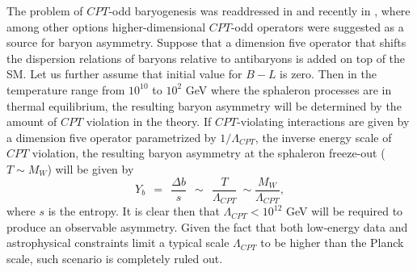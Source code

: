 \documentclass[12pt]{revtex4}
\begin{document}
	
	The problem of $CPT$-odd baryogenesis was readdressed in \cite{Bertolami:1996cq}
and recently in \cite{Carroll:2005dj}, where among other options 
higher-dimensional $CPT$-odd operators 
were suggested as a source for baryon asymmetry. Suppose that a dimension five operator that 
shifts the dispersion relations of baryons relative to antibaryons is added on top of the SM. 
Let us further assume that initial value for $B-L$ is zero.
Then in the temperature range from $10^{10}$ to $10^2$ GeV where the sphaleron processes are in thermal 
equilibrium, the resulting baryon asymmetry will be determined by the amount of $CPT$ violation in the 
theory. If $CPT$-violating interactions are given by a dimension five operator parametrized by $1/\Lambda_{CPT}$, 
the inverse energy scale of $CPT$ violation, the resulting baryon 
asymmetry at the sphaleron freeze-out ($T\sim M_W$) will be given by 
\begin{equation}
\label{baryo}
	Y_b ~~=~~ \frac{\Delta b}{s} ~~\sim~~ \frac{T}{\Lambda_{CPT}}~ \sim \frac{M_W}{\Lambda_{CPT}},
\end{equation}
	where $ s $ is the entropy. It is clear then that $\Lambda_{CPT}< 10^{12}$ GeV will 
	be required to produce an observable asymmetry. 
Given the fact that both low-energy data and 
	astrophysical constraints limit a typical scale $\Lambda_{CPT}$ to be higher than the Planck scale,
	such scenario is completely ruled out. 
\end{document}
